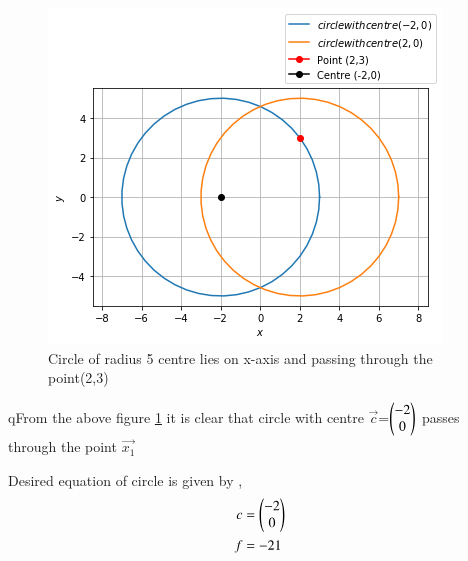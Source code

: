\begin{figure}[h]
    \centering
    \includegraphics[width=\columnwidth]{./solutions/conics/1/2/assignment5.png}
    \caption{Circle of radius 5 centre lies on x-axis and passing through the point(2,3)}
    \label{Fig :1solutions/2/}
\end{figure}

qFrom the above figure \ref{Fig :1solutions/2/} it is clear that circle with centre $\vec{c}$=$\begin{pmatrix}-2\\0\end{pmatrix}$ passes through the point $\vec{x_1}$

Desired equation of circle is given by  ,
\begin{align}
        c&=\begin{pmatrix}-2 \\ 0\end{pmatrix}\\
        f&=-21
\end{align}

